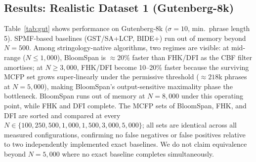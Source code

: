 \documentclass[runningheads]{llncs}
\begin{document}
    \subsection{Results: Realistic Dataset 1 (Gutenberg-8k)}\label{sec:results-realistic}

    Table~\ref{tab:gut} shows performance on Gutenberg-8k ($\sigma = 10$, min.\ phrase length 5). SPMF-based baselines (GST/SA+LCP, BIDE+) run out of memory beyond $N = 500$. Among stringology-native algorithms, two regimes are visible: at mid-range ($N \le 1{,}000$), BloomSpan is $\approx 20\%$ faster than FHK/DFI as the CBF filter amortises; at $N \ge 3{,}000$, FHK/DFI become 10--20\% faster because the surviving MCFP set grows super-linearly under the permissive threshold ($\approx 218$k phrases at $N = 5{,}000$), making BloomSpan's output-sensitive maximality phase the bottleneck. BloomSpan runs out of memory at $N = 8{,}000$ under this operating point, while FHK and DFI complete. The MCFP sets of BloomSpan, FHK, and DFI are sorted and compared at every $N \in \{100, 250, 500, 1{,}000, 1{,}500, 3{,}000, 5{,}000\}$; all sets are identical across all measured configurations, confirming no false negatives or false positives relative to two independently implemented exact baselines. We do not claim equivalence beyond $N = 5{,}000$ where no exact baseline completes simultaneously.
\end{document}
